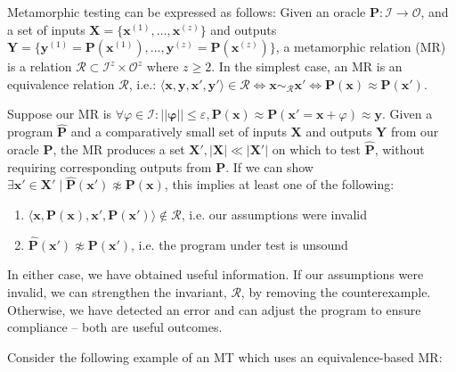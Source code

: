 \documentclass[12pt,initial,twoside,maitrise]{dms}
\numberwithin{equation}{section}
\numberwithin{table}{chapter}
\numberwithin{figure}{chapter}
\begin{document}
Metamorphic testing can be expressed as follows: Given an oracle $\mathbf P: \mathcal I \rightarrow \mathcal O$, and a set of inputs $\mathbf X = \{\mathbf{x}^{(1)}, \dots, \mathbf{x}^{(z)}\}$ and outputs $\mathbf Y = \{\mathbf{y}^{(1)} = \mathbf{P}(\mathbf{x}^{(1)}), \dots, \mathbf{y}^{(z)} = \mathbf{P}(\mathbf{x}^{(z)})\}$, a metamorphic relation (MR) is a relation $\mathcal R \subset \mathcal I^z \times \mathcal O^z$ where $z \geq 2$. In the simplest case, an MR is an equivalence relation $\mathcal R$, i.e.: $\langle \mathbf x, \mathbf y, \mathbf x', \mathbf y' \rangle \in \mathcal R \Leftrightarrow \mathbf x \sim_{\mathcal R} \mathbf x' \Leftrightarrow \mathbf P(\mathbf x) \approx \mathbf P(\mathbf x')$.

Suppose our MR is $\forall \varphi \in \mathcal I: ||\mathbf\varphi|| \leq \varepsilon, \mathbf P(\mathbf x) \approx \mathbf P(\mathbf x' = \mathbf x + \varphi) \approx \mathbf y$. Given a program $\mathbf{\hat P}$ and a comparatively small set of inputs $\mathbf X$ and outputs $\mathbf Y$ from our oracle $\mathbf P$, the MR produces a set $\mathbf X', |\mathbf X| \ll |\mathbf X'|$ on which to test $\mathbf{\hat P}$, without requiring corresponding outputs from $\mathbf P$. If we can show $\exists \mathbf x' \in \mathbf X' \mid \mathbf{\hat P}(\mathbf x') \not\approx \mathbf P(\mathbf x)$, this implies at least one of the following:

\begin{enumerate}
\item $\langle \mathbf x, \mathbf P(\mathbf x), \mathbf x', \mathbf P(\mathbf x')\rangle \notin \mathcal R$, i.e. our assumptions were invalid
\item $\mathbf{\hat P}(\mathbf x') \not\approx \mathbf{P}(\mathbf x')$, i.e. the program under test is unsound
\end{enumerate}
%
In either case, we have obtained useful information. If our assumptions were invalid, we can strengthen the invariant, $\mathcal R$, by removing the counterexample. Otherwise, we have detected an error and can adjust the program to ensure compliance -- both are useful outcomes.

Consider the following example of an MT which uses an equivalence-based MR:
\end{document}
